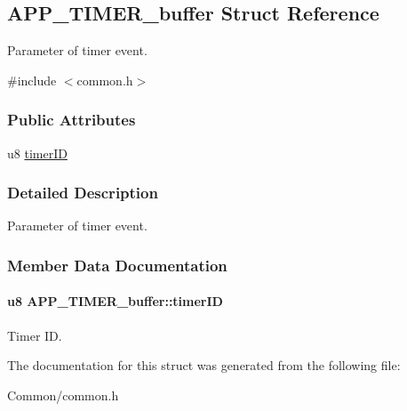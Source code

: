 \hypertarget{struct_a_p_p___t_i_m_e_r__buffer}{}\subsection{A\+P\+P\+\_\+\+T\+I\+M\+E\+R\+\_\+buffer Struct Reference}
\label{struct_a_p_p___t_i_m_e_r__buffer}


Parameter of timer event.  




{\ttfamily \#include $<$common.\+h$>$}

\subsubsection*{Public Attributes}
\begin{DoxyCompactItemize}
\item 
u8 \hyperlink{struct_a_p_p___t_i_m_e_r__buffer_a67b740993763b00e33af52bb896fc14f}{timer\+ID}
\end{DoxyCompactItemize}


\subsubsection{Detailed Description}
Parameter of timer event. 

\subsubsection{Member Data Documentation}
\paragraph[{\texorpdfstring{timer\+ID}{timerID}}]{\setlength{\rightskip}{0pt plus 5cm}u8 A\+P\+P\+\_\+\+T\+I\+M\+E\+R\+\_\+buffer\+::timer\+ID}\hypertarget{struct_a_p_p___t_i_m_e_r__buffer_a67b740993763b00e33af52bb896fc14f}{}\label{struct_a_p_p___t_i_m_e_r__buffer_a67b740993763b00e33af52bb896fc14f}
Timer ID. 

The documentation for this struct was generated from the following file\+:\begin{DoxyCompactItemize}
\item 
Common/common.\+h\end{DoxyCompactItemize}
